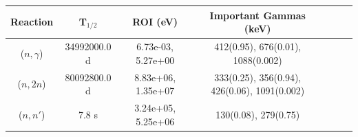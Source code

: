 \begin{figure}[!ht]
   \centering
   \quad
   \\ 
   \quad 
   \\ 

\end{figure}

\begin{table}[h]
\centering
\begin{tabular}{ |c|c|c|c|c|c|c| }
 \hline
 Reaction & T$_{1/2}$ & ROI (eV) & Important Gammas (keV) \\
 \hline 
 ($n,\gamma$) & 34992000.0 d & 6.73e-03, 5.27e+00 & 412(0.95), 676(0.01), 1088(0.002) \\ 
\hline
 ($n,2n$) & 80092800.0 d & 8.83e+06, 1.35e+07 & 333(0.25), 356(0.94), 426(0.06), 1091(0.002) \\ 
\hline
 ($n,n'$) &  7.8 s & 3.24e+05, 5.25e+06 & 130(0.08), 279(0.75) \\ 
\hline
\end{tabular}
\end{table}
